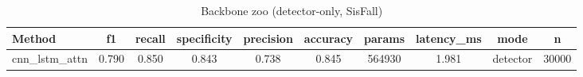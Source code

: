 \begin{table}[t]
\centering
\caption{Backbone zoo (detector-only, SisFall)}
\begin{tabular}{lccccccccc}
\toprule
Method & f1 & recall & specificity & precision & accuracy & params & latency_ms & mode & n \\
\midrule
cnn_lstm_attn & 0.790 & 0.850 & 0.843 & 0.738 & 0.845 & 564930 & 1.981 & detector & 30000 \\
\bottomrule
\end{tabular}
\end{table}